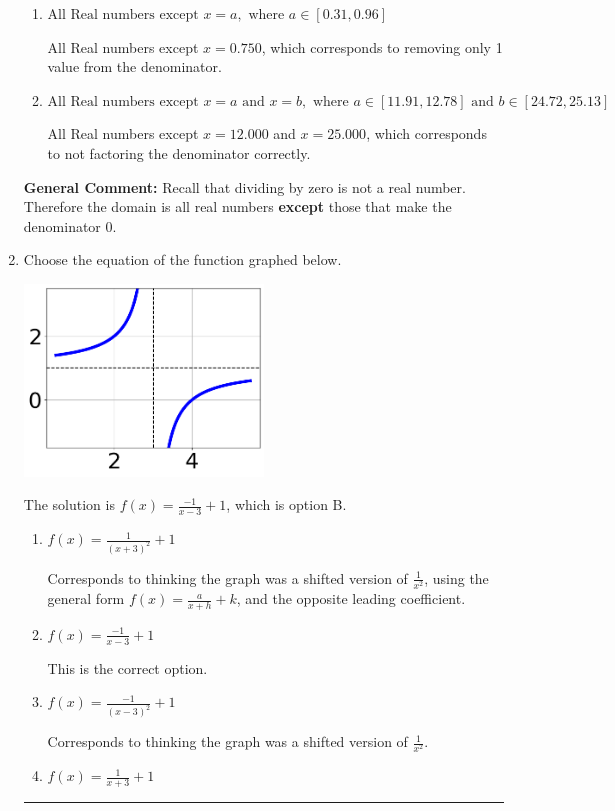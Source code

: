 \documentclass{extbook}[14pt]
\newcommand{\litem}[1]{\item #1

\rule{\textwidth}{0.4pt}}
\begin{document}
\begin{enumerate}
{\begin{enumerate}[label=\Alph*.]
All Real numbers except $x = 0.750$ and $x = 1.000$, which is the correct option.
\item \( \text{All Real numbers except } x = a, \text{ where } a \in [0.31, 0.96] \)

All Real numbers except $x = 0.750$, which corresponds to removing only 1 value from the denominator.
\item \( \text{All Real numbers except } x = a \text{ and } x = b, \text{ where } a \in [11.91, 12.78] \text{ and } b \in [24.72, 25.13] \)

All Real numbers except $x = 12.000$ and $x = 25.000$, which corresponds to not factoring the denominator correctly.
\end{enumerate}

\textbf{General Comment:} Recall that dividing by zero is not a real number. Therefore the domain is all real numbers \textbf{except} those that make the denominator 0.
}
\litem{
Choose the equation of the function graphed below.

\begin{center}
    \includegraphics[width=0.5\textwidth]{../Figures/rationalGraphToEquationCopyA.png}
\end{center}


The solution is \( f(x) = \frac{-1}{x - 3} + 1 \), which is option B.\begin{enumerate}[label=\Alph*.]
\item \( f(x) = \frac{1}{(x + 3)^2} + 1 \)

Corresponds to thinking the graph was a shifted version of $\frac{1}{x^2}$, using the general form $f(x) = \frac{a}{x+h}+k$, and the opposite leading coefficient.
\item \( f(x) = \frac{-1}{x - 3} + 1 \)

This is the correct option.
\item \( f(x) = \frac{-1}{(x - 3)^2} + 1 \)

Corresponds to thinking the graph was a shifted version of $\frac{1}{x^2}$.
\item \( f(x) = \frac{1}{x + 3} + 1 \)


\end{enumerate}}
\end{enumerate}
\end{document}
